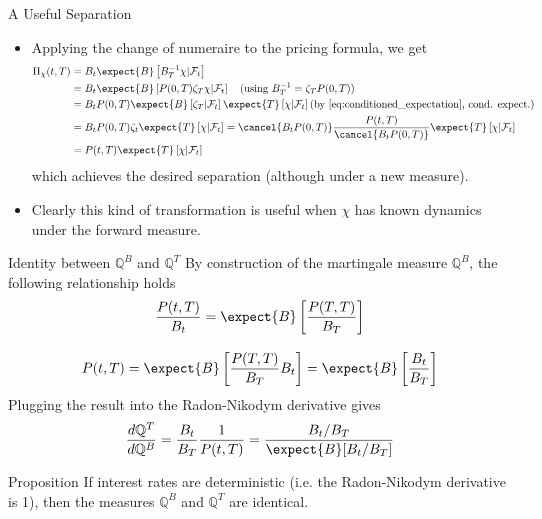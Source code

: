 \documentclass{beamer}
\begin{document}
\begin{frame}{A Useful Separation}
  \begin{itemize}
  \item<1-> Applying the change of numeraire to the pricing formula, we get
    \begin{equation*}
      \begin{aligned}
	\Pi_\chi(t,T) & = B_t\expect{B}\left[B^{-1}_T\chi|\mathcal{F}_t\right] \\
	& = B_t\expect{B}\left[P(0,T)\zeta_T\chi|\mathcal{F}_t\right]\quad\text{(using } B_T^{-1} = \zeta_TP(0,T))\\
	& = B_tP(0,T)\expect{B}\left[\zeta_T|\mathcal{F}_t\right]\expect{T}\left[\chi|\mathcal{F}_t\right]\text{(by \cref{eq:conditioned_expectation}, cond. expect.)}\\
	& = B_tP(0,T)\zeta_t\expect{T}\left[\chi|\mathcal{F}_t\right] =  \cancel{B_tP(0,T)}\frac{P(t,T)}{\cancel{B_tP(0,T)}}\expect{T}\left[\chi|\mathcal{F}_t\right] \\
	& = P(t,T)\expect{T}\left[\chi|\mathcal{F}_t\right] \\
      \end{aligned}
    \end{equation*}
    which achieves the desired separation (although under a new measure).
  \item<2-> Clearly this kind of transformation is useful when $\chi$ has known dynamics under the forward measure.
  \end{itemize}
\end{frame}

\begin{frame}{Identity between $\mathbb{Q}^B$ and $\mathbb{Q}^T$}
  By construction of the martingale measure $\mathbb{Q}^B$, the following relationship holds
  \begin{equation*}
    \begin{gathered}
      \frac{P(t,T)}{B_t}=\expect{B}\left[\frac{P(T,T)}{B_T}\right]\\[0.3cm]
      P(t,T)=\expect{B}\left[\frac{P(T,T)}{B_T}B_t\right] = \expect{B}\left[\frac{B_t}{B_T}\right]
    \end{gathered}
  \end{equation*}
	\pause
  Plugging the result into the Radon-Nikodym derivative gives
  \begin{equation*}
    \frac{d\mathbb{Q}^T}{d\mathbb{Q}^B} = \frac{B_t}{B_T}\frac{1}{P(t,T)} =\frac{B_t/B_T}{\expect{B}[B_t/B_T]}
  \end{equation*}
\myendproof
	\pause
  \begin{block}{Proposition}
    If interest rates are deterministic (i.e. the Radon-Nikodym derivative is 1), then the measures $\mathbb{Q}^B$ and $\mathbb{Q}^T$ are identical.
  \end{block}
\end{frame}
\end{document}
